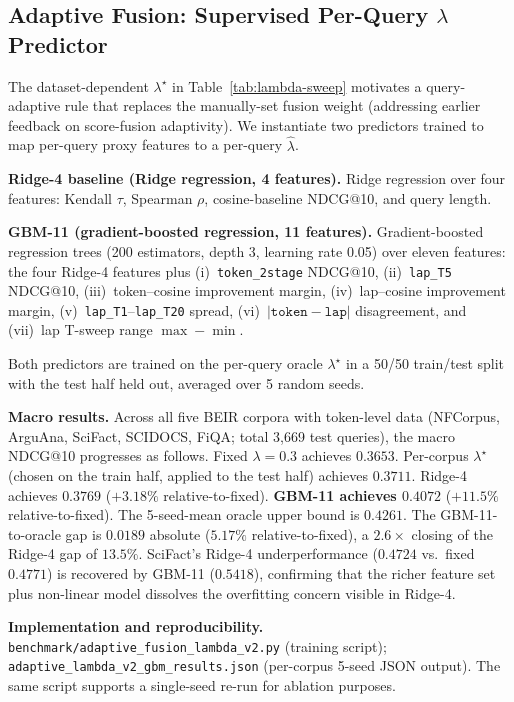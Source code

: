 \documentclass[review,1p]{elsarticle}
\begin{document}
\subsection{Adaptive Fusion: Supervised Per-Query $\lambda$ Predictor}
\label{subsec:adaptive-lambda}

The dataset-dependent $\lambda^\star$ in Table~\ref{tab:lambda-sweep} motivates a query-adaptive rule that replaces the manually-set fusion weight (addressing earlier feedback on score-fusion adaptivity). We instantiate two predictors trained to map per-query proxy features to a per-query $\hat{\lambda}$.

\textbf{Ridge-4 baseline (Ridge regression, 4 features).} Ridge regression over four features: Kendall $\tau$, Spearman $\rho$, cosine-baseline NDCG@10, and query length.

\textbf{GBM-11 (gradient-boosted regression, 11 features).} Gradient-boosted regression trees (200 estimators, depth 3, learning rate 0.05) over eleven features: the four Ridge-4 features plus (i)~\texttt{token\_2stage} NDCG@10, (ii)~\texttt{lap\_T5} NDCG@10, (iii)~token--cosine improvement margin, (iv)~lap--cosine improvement margin, (v)~\texttt{lap\_T1}--\texttt{lap\_T20} spread, (vi)~$|\texttt{token}-\texttt{lap}|$ disagreement, and (vii)~lap T-sweep range $\max-\min$.

Both predictors are trained on the per-query oracle $\lambda^\star$ in a 50/50 train/test split with the test half held out, averaged over 5 random seeds.

\textbf{Macro results.} Across all five BEIR corpora with token-level data (NFCorpus, ArguAna, SciFact, SCIDOCS, FiQA; total 3{,}669 test queries), the macro NDCG@10 progresses as follows. Fixed $\lambda=0.3$ achieves $0.3653$. Per-corpus $\lambda^\star$ (chosen on the train half, applied to the test half) achieves $0.3711$. Ridge-4 achieves $0.3769$ ($+3.18\%$ relative-to-fixed). \textbf{GBM-11 achieves $\mathbf{0.4072}$} ($\mathbf{+11.5\%}$ relative-to-fixed). The 5-seed-mean oracle upper bound is $0.4261$. The GBM-11-to-oracle gap is $0.0189$ absolute ($5.17\%$ relative-to-fixed), a $\mathbf{2.6\times}$ closing of the Ridge-4 gap of $13.5\%$. SciFact's Ridge-4 underperformance ($0.4724$ vs.\ fixed $0.4771$) is recovered by GBM-11 ($0.5418$), confirming that the richer feature set plus non-linear model dissolves the overfitting concern visible in Ridge-4.

\textbf{Implementation and reproducibility.} \texttt{benchmark/adaptive\_fusion\_lambda\_v2.py} (training script); \texttt{adaptive\_lambda\_v2\_gbm\_results.json} (per-corpus 5-seed JSON output). The same script supports a single-seed re-run for ablation purposes.
\end{document}
